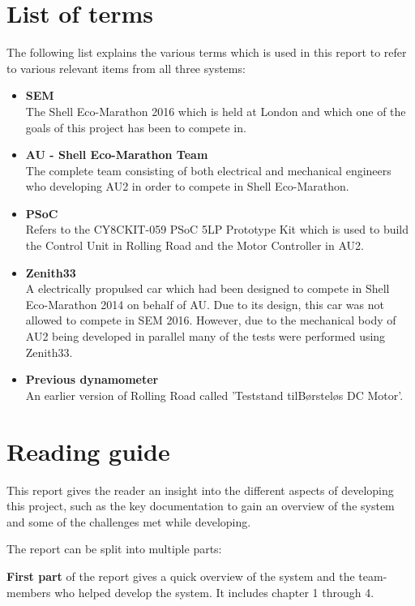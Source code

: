 \section{List of terms}
The following list explains the various terms which is used in this report to refer to various relevant items from all three systems:
\begin{itemize}
	\item \textbf{SEM}\\
	The Shell Eco-Marathon 2016 which is held at London and which one of the goals of this project has been to compete in.
	\item \textbf{AU - Shell Eco-Marathon Team}\\
	The complete team consisting of both electrical and mechanical engineers who developing AU2 in order to compete in Shell Eco-Marathon.
	\item \textbf{PSoC}\\
	Refers to the CY8CKIT-059 PSoC 5LP Prototype Kit which is used to build the Control Unit in Rolling Road and the Motor Controller in AU2.
	\item \textbf{Zenith33}\\
	A electrically propulsed car which had been designed to compete in Shell Eco-Marathon 2014\cite{BAC_zenith33} on behalf of AU. Due to its design, this car was not allowed to compete in SEM 2016. However, due to the mechanical body of AU2 being developed in parallel many of the tests were performed using Zenith33.
	\item \textbf{Previous dynamometer}\\
	An earlier version of Rolling Road called 'Teststand tilBørsteløs DC Motor'\cite{BAC_rullefelt}. 
\end{itemize}


\section{Reading guide}

This report gives the reader an insight into the different aspects of developing this project, such as the key documentation to gain an overview of the system and some of the challenges met while developing.

The report can be split into multiple parts:

\textbf{First part} of the report gives a quick overview of the system and the team-members who helped develop the system. It includes chapter 1 through 4.

